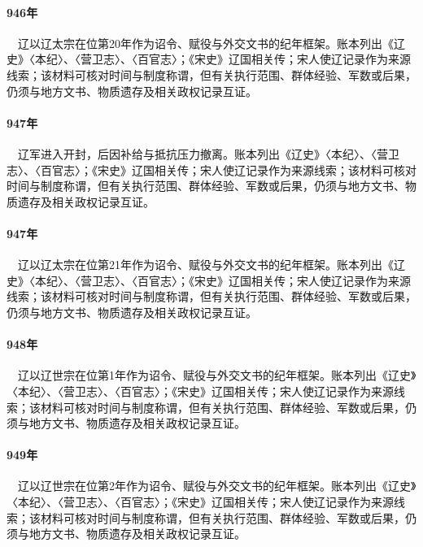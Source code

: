 \paragraph{946年}　辽以辽太宗在位第20年作为诏令、赋役与外交文书的纪年框架。账本列出《辽史》〈本纪〉、〈营卫志〉、〈百官志〉；《宋史》辽国相关传；宋人使辽记录作为来源线索；该材料可核对时间与制度称谓，但有关执行范围、群体经验、军数或后果，仍须与地方文书、物质遗存及相关政权记录互证。

\paragraph{947年}　辽军进入开封，后因补给与抵抗压力撤离。账本列出《辽史》〈本纪〉、〈营卫志〉、〈百官志〉；《宋史》辽国相关传；宋人使辽记录作为来源线索；该材料可核对时间与制度称谓，但有关执行范围、群体经验、军数或后果，仍须与地方文书、物质遗存及相关政权记录互证。

\paragraph{947年}　辽以辽太宗在位第21年作为诏令、赋役与外交文书的纪年框架。账本列出《辽史》〈本纪〉、〈营卫志〉、〈百官志〉；《宋史》辽国相关传；宋人使辽记录作为来源线索；该材料可核对时间与制度称谓，但有关执行范围、群体经验、军数或后果，仍须与地方文书、物质遗存及相关政权记录互证。

\paragraph{948年}　辽以辽世宗在位第1年作为诏令、赋役与外交文书的纪年框架。账本列出《辽史》〈本纪〉、〈营卫志〉、〈百官志〉；《宋史》辽国相关传；宋人使辽记录作为来源线索；该材料可核对时间与制度称谓，但有关执行范围、群体经验、军数或后果，仍须与地方文书、物质遗存及相关政权记录互证。

\paragraph{949年}　辽以辽世宗在位第2年作为诏令、赋役与外交文书的纪年框架。账本列出《辽史》〈本纪〉、〈营卫志〉、〈百官志〉；《宋史》辽国相关传；宋人使辽记录作为来源线索；该材料可核对时间与制度称谓，但有关执行范围、群体经验、军数或后果，仍须与地方文书、物质遗存及相关政权记录互证。


